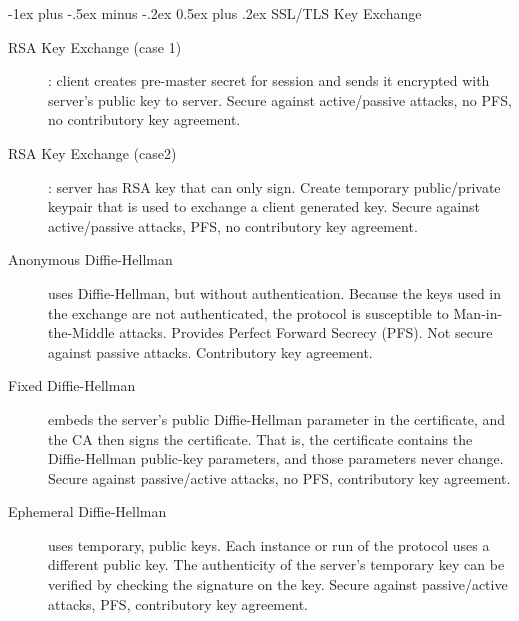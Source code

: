 \documentclass[a4paper,twocolumn]{article}
\makeatletter
\renewcommand{\section}{\@startsection{section}{1}{0mm}%
                                {-1ex plus -.5ex minus -.2ex}%
                                {0.5ex plus .2ex}%
                                {\normalfont\large\bfseries}}
\makeatother
\begin{document}
\section{SSL/TLS Key Exchange}
\begin{description}
\item[RSA Key Exchange (case 1)]: client creates pre-master secret for session and sends it encrypted with server's public key to server. Secure against active/passive attacks, no PFS, no contributory key agreement.

\item[RSA Key Exchange (case2)]: server has RSA key that can only sign. Create temporary public/private keypair that is used to exchange a client generated key. Secure against active/passive attacks, PFS, no contributory key agreement.

\item[Anonymous Diffie-Hellman] uses Diffie-Hellman, but without authentication. Because the keys used in the exchange are not authenticated, the protocol is susceptible to Man-in-the-Middle attacks. Provides Perfect Forward Secrecy (PFS). Not secure against passive attacks. Contributory key agreement.

\item[Fixed Diffie-Hellman] embeds the server's public Diffie-Hellman parameter in the certificate, and the CA then signs the certificate. That is, the certificate contains the Diffie-Hellman public-key parameters, and those parameters never change. Secure against passive/active attacks, no PFS, contributory key agreement.

\item[Ephemeral Diffie-Hellman] uses temporary, public keys. Each instance or run of the protocol uses a different public key. The authenticity of the server's temporary key can be verified by checking the signature on the key. Secure against passive/active attacks, PFS, contributory key agreement.
\end{description}
\end{document}
